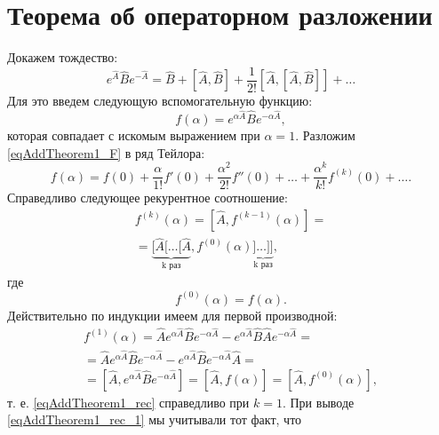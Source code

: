 \section{Теорема об операторном разложении}
\label{AddTheorem1}

Докажем тождество:
\begin{equation}
e^{\hat{A}}\hat{B}e^{-\hat{A}} = 
\hat{B} + \left[\hat{A},\hat{B}\right] + 
\frac{1}{2!} \left[\hat{A},\left[\hat{A},\hat{B}\right]\right] + \dots
\label{eqAddTheorem1_Main}
\end{equation}
Для это введем следующую вспомогательную функцию:
\begin{equation}
f\left(\alpha\right) = 
e^{\alpha\hat{A}}\hat{B}e^{-\alpha\hat{A}},
\label{eqAddTheorem1_F}
\end{equation}
которая совпадает с искомым выражением при $\alpha = 1$. Разложим
\eqref{eqAddTheorem1_F} в ряд Тейлора:
\begin{equation}
f\left(\alpha\right) = 
f\left(0\right) + \frac{\alpha}{1!}f'\left(0\right) +
\frac{\alpha^2}{2!}f''\left(0\right) + 
\dots +
\frac{\alpha^k}{k!}f^{(k)}\left(0\right) + \dots.
\label{eqAddTheorem1_T}
\end{equation}
Справедливо следующее рекурентное соотношение:
\begin{eqnarray}
f^{(k)}\left(\alpha\right) = \left[\hat{A},
  f^{(k-1)}\left(\alpha\right)\right] = 
\nonumber \\
=
\underbrace{
[\hat{A}[\dots[\hat{A}}_{\mbox{k
  раз}},
f^{(0)}\left(\alpha\right)
\underbrace{]\dots]]}_{\mbox{k
  раз}},
\label{eqAddTheorem1_rec}
\end{eqnarray}
где 
\[
f^{(0)}\left(\alpha\right) = f\left(\alpha\right).
\]
Действительно по индукции имеем для первой производной:
\begin{eqnarray}
f^{(1)}\left(\alpha\right) = \hat{A}
  e^{\alpha\hat{A}}\hat{B}e^{-\alpha\hat{A}} -
  e^{\alpha\hat{A}}\hat{B}\hat{A}e^{-\alpha\hat{A}} = 
\nonumber \\
= \hat{A}
  e^{\alpha\hat{A}}\hat{B}e^{-\alpha\hat{A}} -
  e^{\alpha\hat{A}}\hat{B}e^{-\alpha\hat{A}}\hat{A} = 
\nonumber \\
=
\left[\hat{A}, e^{\alpha\hat{A}}\hat{B}e^{-\alpha\hat{A}}\right] = 
\left[\hat{A}, f\left(\alpha\right)\right] = 
\left[\hat{A}, f^{(0)}\left(\alpha\right)\right],
\label{eqAddTheorem1_rec_1}
\end{eqnarray}
т. е. \eqref{eqAddTheorem1_rec} справедливо при $k = 1$. При выводе
\eqref{eqAddTheorem1_rec_1} мы учитывали тот факт, что 
